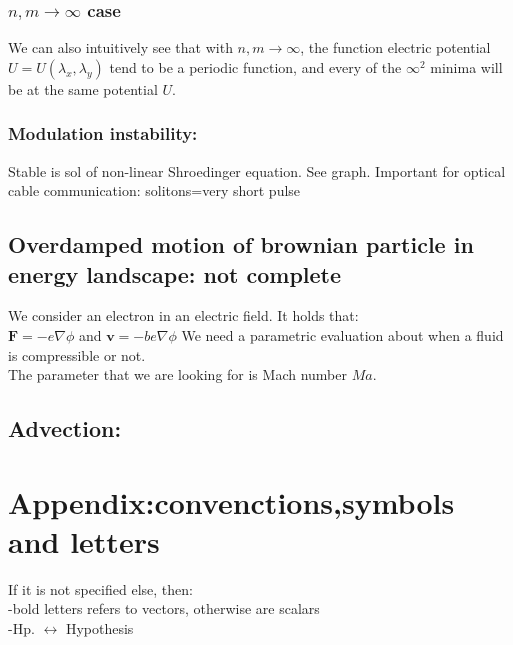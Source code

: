 \documentclass[a4paper,11pt]{article}
\begin{document}
\subsubsection{$n,m \rightarrow \infty$ case} 
We can also intuitively see that with $n,m \rightarrow \infty$, the function electric potential $U=U(\lambda_x,\lambda_y)$ tend to be a periodic function, and every of the $\infty^2$ minima will be at the same potential $U$.

\subsubsection{Modulation instability:}
Stable is sol of non-linear Shroedinger equation. See graph.
Important for optical cable communication: solitons=very short pulse

\subsection{Overdamped motion of brownian particle in energy landscape: not complete}
We consider an electron in an electric field. It holds that: \\
$ \mathbf{F}=-e \nabla \phi $ and $ \mathbf{v}=-b e \nabla \phi$
We need a parametric evaluation about when a fluid is compressible or not. \\
The parameter that we are looking for is Mach number $Ma$.

\subsection{Advection:}

 
 
 
 
 
 
 
 
 
 
 
 
 
 
 
 
 \section{Appendix:convenctions,symbols and letters}
 If it is not specified else, then:\\
 -bold letters refers to vectors, otherwise are scalars\\
 -Hp. $\leftrightarrow$ Hypothesis\\
\end{document}
